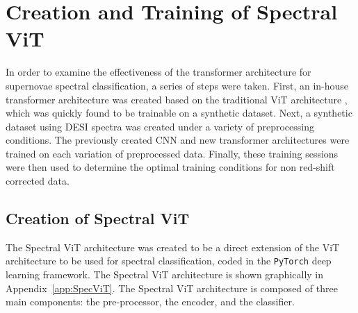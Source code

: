 

\chapter{Creation and Training of Spectral ViT}
\label{chap:methods}

In order to examine the effectiveness of the transformer architecture for supernovae
spectral classification, a series of steps were taken. First, an in-house transformer 
architecture was created based on the traditional ViT architecture \cite{dosovitskiy2020}, 
which was quickly found to be trainable on a synthetic dataset. Next, a synthetic dataset 
using DESI spectra was created under a variety of preprocessing conditions. The previously 
created CNN and new transformer architectures were trained on each variation of 
preprocessed data. Finally, these training sessions were then used to determine 
the optimal training conditions for non red-shift corrected data. 
\section{Creation of Spectral ViT}\label{sec:SpecViT}
The Spectral ViT architecture was created to be a direct extension of the ViT architecture
\cite{dosovitskiy2020} to be used for spectral classification, coded in the \texttt{PyTorch}
deep learning framework. The Spectral ViT architecture is shown graphically in
Appendix~\ref{app:SpecViT}. The Spectral ViT architecture is
composed of three main components: the pre-processor, the encoder, and the classifier. 

